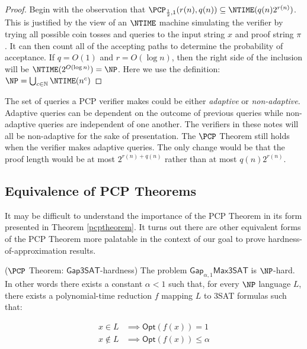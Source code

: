 \begin{proof}
Begin with the observation that $\PCP_{\frac{1}{2},1}(r(n), q(n)) \subseteq \NTIME(q(n)2^{r(n)})$. This is justified by the view of an $\NTIME$ machine simulating the verifier by trying all possible coin tosses and queries to the input string $x$ and proof string $\pi$. It can then count all of the accepting paths to determine the probability of acceptance. If $q = O(1)$ and $r = O(\log{n})$, then the right side of the inclusion will be $\NTIME(2^{O(\log{n})}) = \NP$. Here we use the definition:
%
$ \NP = \bigcup_{c \in \mathbb{N}} \NTIME(n^c) $
\end{proof}

\begin{remark}
  The set of queries a PCP verifier makes could be either \emph{adaptive} or \emph{non-adaptive}. Adaptive queries can be dependent on the outcome of previous queries while non-adaptive queries are independent of one another. The verifiers in these notes will all be non-adaptive for the sake of presentation. The $\PCP$ Theorem still holds when the verifier makes adaptive queries. The only change would be that the proof length would be at most $2^{r(n) + q(n)}$ rather than at most $q(n)2^{r(n)}$.
\end{remark}


%
\subsection{Equivalence of PCP Theorems}
It may be difficult to understand the importance of the PCP Theorem in its form presented in Theorem \ref{pcptheorem}. It turns out there are other equivalent forms of the PCP Theorem more palatable in the context of our goal to prove hardness-of-approximation results.

\begin{theorem} \label{pcpgapsat}($\PCP$ Theorem: $\mathsf{Gap3SAT}$-hardness)
The problem $\mathsf{Gap}_{\alpha,1}\mathsf{Max3SAT}$ is $\NP$-hard. In other words there exists a constant $\alpha  < 1$ such that, for every $\NP$ language $L$, there exists a polynomial-time reduction $f$ mapping $L$ to 3SAT formulas such that:

\begin{align*}
  x \in L & \implies \mathsf{Opt}(f(x)) = 1 \\
  x \not\in L & \implies \mathsf{Opt}(f(x)) \leq \alpha
\end{align*}
\end{theorem}

